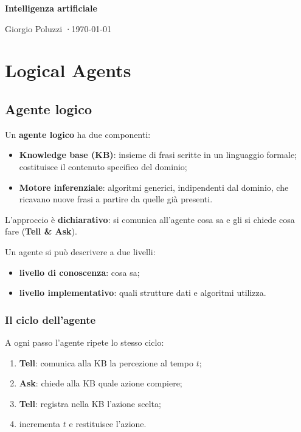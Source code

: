 \documentclass[11pt, a4paper]{article}
\begin{document}
\begingroup
  \raggedright
  {\sffamily\bfseries\Huge Intelligenza artificiale\par}
  \vspace{4pt}
  {\sffamily\color{tenue} Giorgio Poluzzi \quad·\quad \today\par}
\endgroup
\vspace{1.6\baselineskip}

\section*{Logical Agents}

\subsection{Agente logico}

Un \textbf{agente logico} ha due componenti:

\begin{itemize}
  \item \textbf{Knowledge base (KB)}: insieme di frasi scritte in un linguaggio formale; costituisce il contenuto specifico del dominio;
  \item \textbf{Motore inferenziale}: algoritmi generici, indipendenti dal dominio, che ricavano nuove frasi a partire da quelle già presenti.
\end{itemize}

L'approccio è \textbf{dichiarativo}: si comunica all'agente cosa sa e gli si chiede cosa fare (\textbf{Tell \& Ask}).

Un agente si può descrivere a due livelli:
\begin{itemize}
  \item \textbf{livello di conoscenza}: cosa sa;
  \item \textbf{livello implementativo}: quali strutture dati e algoritmi utilizza.
\end{itemize}

\subsubsection*{Il ciclo dell'agente}

A ogni passo l'agente ripete lo stesso ciclo:
\begin{enumerate}
  \item \textbf{Tell}: comunica alla KB la percezione al tempo $t$;
  \item \textbf{Ask}: chiede alla KB quale azione compiere;
  \item \textbf{Tell}: registra nella KB l'azione scelta;
  \item incrementa $t$ e restituisce l'azione.
\end{enumerate}
\end{document}
